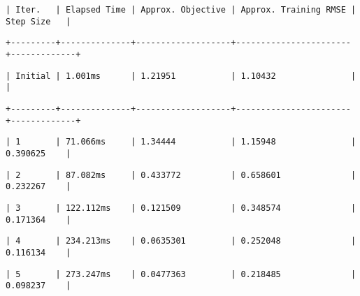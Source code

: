\documentclass[11pt]{article}
\begin{document}
    
    
    \begin{verbatim}
| Iter.   | Elapsed Time | Approx. Objective | Approx. Training RMSE | Step Size   |
    \end{verbatim}

    
    
    \begin{verbatim}
+---------+--------------+-------------------+-----------------------+-------------+
    \end{verbatim}

    
    
    \begin{verbatim}
| Initial | 1.001ms      | 1.21951           | 1.10432               |             |
    \end{verbatim}

    
    
    \begin{verbatim}
+---------+--------------+-------------------+-----------------------+-------------+
    \end{verbatim}

    
    
    \begin{verbatim}
| 1       | 71.066ms     | 1.34444           | 1.15948               | 0.390625    |
    \end{verbatim}

    
    
    \begin{verbatim}
| 2       | 87.082ms     | 0.433772          | 0.658601              | 0.232267    |
    \end{verbatim}

    
    
    \begin{verbatim}
| 3       | 122.112ms    | 0.121509          | 0.348574              | 0.171364    |
    \end{verbatim}

    
    
    \begin{verbatim}
| 4       | 234.213ms    | 0.0635301         | 0.252048              | 0.116134    |
    \end{verbatim}

    
    
    \begin{verbatim}
| 5       | 273.247ms    | 0.0477363         | 0.218485              | 0.098237    |
    \end{verbatim}
\end{document}
